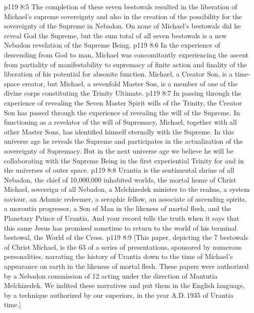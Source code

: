 \vs p119 8:5 The completion of these seven bestowals resulted in the liberation of Michael’s supreme sovereignty and also in the creation of the possibility for the sovereignty of the Supreme in Nebadon. On none of Michael’s bestowals did he reveal God the Supreme, but the sum total of all seven bestowals is a new Nebadon revelation of the Supreme Being.
\vs p119 8:6 In the experience of descending from God to man, Michael was concomitantly experiencing the ascent from partiality of manifestability to supremacy of finite action and finality of the liberation of his potential for absonite function. Michael, a Creator Son, is a time\hyp{}space creator, but Michael, a sevenfold Master Son, is a member of one of the divine corps constituting the Trinity Ultimate.
\vs p119 8:7 In passing through the experience of revealing the Seven Master Spirit wills of the Trinity, the Creator Son has passed through the experience of revealing the will of the Supreme. In functioning as a revelator of the will of Supremacy, Michael, together with all other Master Sons, has identified himself eternally with the Supreme. In this universe age he reveals the Supreme and participates in the actualization of the sovereignty of Supremacy. But in the next universe age we believe he will be collaborating with the Supreme Being in the first experiential Trinity for and in the universes of outer space.
\vs p119 8:8 \pc Urantia is the sentimental shrine of all Nebadon, the chief of 10,000,000 inhabited worlds, the mortal home of Christ Michael, sovereign of all Nebadon, a Melchizedek minister to the realms, a system saviour, an Adamic redeemer, a seraphic fellow, an associate of ascending spirits, a morontia progressor, a Son of Man in the likeness of mortal flesh, and the Planetary Prince of Urantia. And your record tells the truth when it says that this same Jesus has promised sometime to return to the world of his terminal bestowal, the World of the Cross.
\vsetoff
\vs p119 8:9 [This paper, depicting the 7 bestowals of Christ Michael, is the 63 of a series of presentations, sponsored by numerous personalities, narrating the history of Urantia down to the time of Michael’s appearance on earth in the likeness of mortal flesh. These papers were authorized by a Nebadon commission of 12 acting under the direction of Mantutia Melchizedek. We indited these narratives and put them in the English language, by a technique authorized by our superiors, in the year A.D.\,1935 of Urantia time.]
